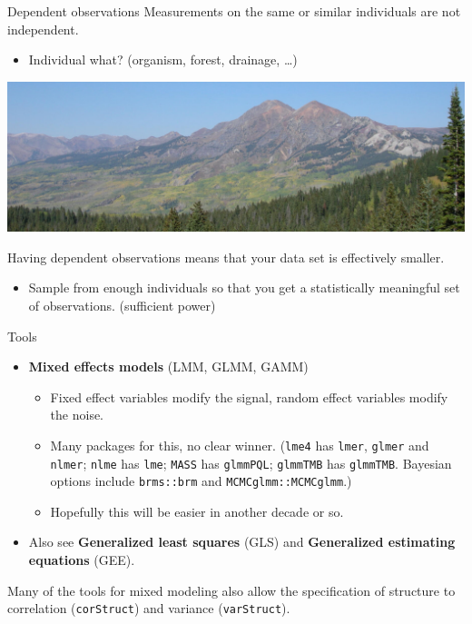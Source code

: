 \documentclass[
  ignorenonframetext,
]{beamer}
\providecommand{\tightlist}{%
  \setlength{\itemsep}{0pt}\setlength{\parskip}{0pt}}
\begin{document}
\begin{frame}{Dependent observations}
\protect\hypertarget{dependent-observations}{}
Measurements on the same or similar individuals are not independent.

\begin{itemize}
\tightlist
\item
  Individual what? (organism, forest, drainage, \ldots)
\end{itemize}

\includegraphics[width=\textwidth,height=0.4\textheight]{../images/ruby.jpg}

Having dependent observations means that your data set is effectively
smaller.

\begin{itemize}
\tightlist
\item
  Sample from enough individuals so that you get a statistically
  meaningful set of observations. (sufficient power)
\end{itemize}
\end{frame}

\begin{frame}[fragile]{Tools}
\protect\hypertarget{tools}{}
\begin{itemize}
\tightlist
\item
  \textbf{Mixed effects models} (LMM, GLMM, GAMM)

  \begin{itemize}
  \tightlist
  \item
    Fixed effect variables modify the signal, random effect variables
    modify the noise.
  \item
    Many packages for this, no clear winner. (\texttt{lme4} has
    \texttt{lmer}, \texttt{glmer} and \texttt{nlmer}; \texttt{nlme} has
    \texttt{lme}; \texttt{MASS} has \texttt{glmmPQL}; \texttt{glmmTMB}
    has \texttt{glmmTMB}. Bayesian options include \texttt{brms::brm}
    and \texttt{MCMCglmm::MCMCglmm}.)
  \item
    Hopefully this will be easier in another decade or so.
  \end{itemize}
\item
  Also see \textbf{Generalized least squares} (GLS) and
  \textbf{Generalized estimating equations} (GEE).
\end{itemize}

Many of the tools for mixed modeling also allow the specification of
structure to correlation (\texttt{corStruct}) and variance
(\texttt{varStruct}).
\end{frame}
\end{document}
